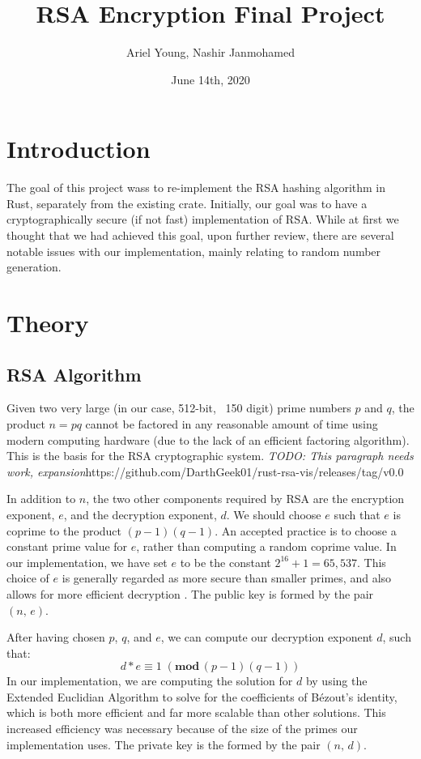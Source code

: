 \documentclass{article}
\title{RSA Encryption Final Project}
\author{Ariel Young, Nashir Janmohamed}
\date{June 14th, 2020}
\begin{document}
\maketitle
\tableofcontents

\section{Introduction}
The goal of this project wass to re-implement the RSA hashing algorithm in Rust, separately from the existing crate. Initially, our goal was to have a cryptographically secure (if not fast) implementation of RSA. While at first we thought that we had achieved this goal, upon further review, there are several notable issues with our implementation, mainly relating to random number generation.

\section{Theory}
\subsection{RSA Algorithm}
Given two very large (in our case, 512-bit, ~150 digit) prime numbers $p$ and $q$, the product $n = pq$ cannot be factored in any reasonable amount of time using modern computing hardware (due to the lack of an efficient factoring algorithm). This is the basis for the RSA cryptographic system. \textit{TODO: This paragraph needs work, expansion}https://github.com/DarthGeek01/rust-rsa-vis/releases/tag/v0.0

In addition to $n$, the two other components required by RSA are the encryption exponent, $e$, and the decryption exponent, $d$. We should choose $e$ such that $e$ is coprime to the product $(p - 1)(q - 1)$. An accepted practice is to choose a constant prime value for $e$, rather than computing a random coprime value. In our implementation, we have set $e$ to be the constant $2^{16} + 1 = 65,537$. This choice of $e$ is generally regarded as more secure than smaller primes, and also allows for more efficient decryption \cite{rsa_attacks}. The public key is formed by the pair $(n,\, e)$.

After having chosen $p$, $q$, and $e$, we can compute our decryption exponent $d$, such that: \[ d*e \equiv 1 \;(\textbf{mod}\,(p - 1)(q - 1)) \] In our implementation, we are computing the solution for $d$ by using the Extended Euclidian Algorithm to solve for the coefficients of Bézout's identity, which is both more efficient and far more scalable than other solutions. This increased efficiency was necessary because of the size of the primes our implementation uses. The private key is the formed by the pair $(n,\, d)$.
\end{document}
